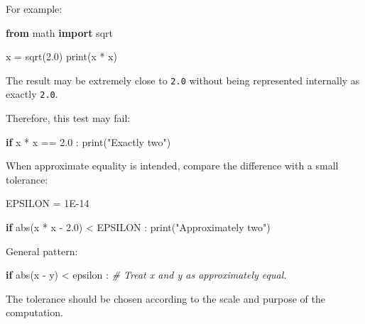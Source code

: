 \documentclass[
  11pt,
  a4paper,
]{article}
\newenvironment{Shaded}{}{}
\newcommand{\BuiltInTok}[1]{\textcolor[rgb]{0.00,0.50,0.00}{#1}}
\newcommand{\CommentTok}[1]{\textcolor[rgb]{0.38,0.63,0.69}{\textit{#1}}}
\newcommand{\ControlFlowTok}[1]{\textcolor[rgb]{0.00,0.44,0.13}{\textbf{#1}}}
\newcommand{\FloatTok}[1]{\textcolor[rgb]{0.25,0.63,0.44}{#1}}
\newcommand{\ImportTok}[1]{\textcolor[rgb]{0.00,0.50,0.00}{\textbf{#1}}}
\newcommand{\NormalTok}[1]{#1}
\newcommand{\OperatorTok}[1]{\textcolor[rgb]{0.40,0.40,0.40}{#1}}
\newcommand{\StringTok}[1]{\textcolor[rgb]{0.25,0.44,0.63}{#1}}
\begin{document}
For example:

\begin{Shaded}
\begin{Highlighting}[]
\ImportTok{from}\NormalTok{ math }\ImportTok{import}\NormalTok{ sqrt}

\NormalTok{x }\OperatorTok{=}\NormalTok{ sqrt(}\FloatTok{2.0}\NormalTok{)}
\BuiltInTok{print}\NormalTok{(x }\OperatorTok{*}\NormalTok{ x)}
\end{Highlighting}
\end{Shaded}

The result may be extremely close to \texttt{2.0} without being
represented internally as exactly \texttt{2.0}.

Therefore, this test may fail:

\begin{Shaded}
\begin{Highlighting}[]
\ControlFlowTok{if}\NormalTok{ x }\OperatorTok{*}\NormalTok{ x }\OperatorTok{==} \FloatTok{2.0}\NormalTok{ :}
    \BuiltInTok{print}\NormalTok{(}\StringTok{"Exactly two"}\NormalTok{)}
\end{Highlighting}
\end{Shaded}

When approximate equality is intended, compare the difference with a
small tolerance:

\begin{Shaded}
\begin{Highlighting}[]
\NormalTok{EPSILON }\OperatorTok{=} \FloatTok{1E{-}14}

\ControlFlowTok{if} \BuiltInTok{abs}\NormalTok{(x }\OperatorTok{*}\NormalTok{ x }\OperatorTok{{-}} \FloatTok{2.0}\NormalTok{) }\OperatorTok{\textless{}}\NormalTok{ EPSILON :}
    \BuiltInTok{print}\NormalTok{(}\StringTok{"Approximately two"}\NormalTok{)}
\end{Highlighting}
\end{Shaded}

General pattern:

\begin{Shaded}
\begin{Highlighting}[]
\ControlFlowTok{if} \BuiltInTok{abs}\NormalTok{(x }\OperatorTok{{-}}\NormalTok{ y) }\OperatorTok{\textless{}}\NormalTok{ epsilon :}
    \CommentTok{\# Treat x and y as approximately equal.}
\end{Highlighting}
\end{Shaded}

The tolerance should be chosen according to the scale and purpose of the
computation.
\end{document}
